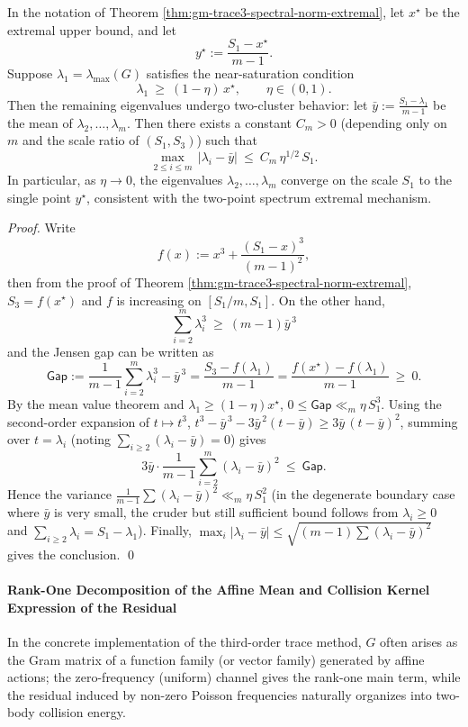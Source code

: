 \begin{proposition}\label{prop:gm-trace3-near-extremal-clustering}
In the notation of Theorem \ref{thm:gm-trace3-spectral-norm-extremal}, let \(x^\star\) be the extremal upper bound, and let
\[
y^\star:=\frac{S_1-x^\star}{m-1}.
\]
Suppose \(\lambda_1=\lambda_{\max}(G)\) satisfies the near-saturation condition
\[
\lambda_1\ \ge\ (1-\eta)\,x^\star,\qquad \eta\in(0,1).
\]
Then the remaining eigenvalues undergo two-cluster behavior: let
\(
\bar y:=\frac{S_1-\lambda_1}{m-1}
\)
be the mean of \(\lambda_2,\dots,\lambda_m\). Then there exists a constant \(C_m>0\) (depending only on \(m\) and the scale ratio of \((S_1,S_3)\)) such that
\[
\max_{2\le i\le m}\,|\lambda_i-\bar y|
\ \le\
C_m\,\eta^{1/2}\,S_1.
\]
In particular, as \(\eta\to 0\), the eigenvalues \(\lambda_2,\dots,\lambda_m\) converge on the scale \(S_1\) to the single point \(y^\star\), consistent with the two-point spectrum extremal mechanism.
\end{proposition}

\begin{proof}
Write
\[
f(x):=x^3+\frac{(S_1-x)^3}{(m-1)^2},
\]
then from the proof of Theorem \ref{thm:gm-trace3-spectral-norm-extremal},
\(
S_3=f(x^\star)
\) and \(f\) is increasing on \([S_1/m,S_1]\).
On the other hand,
\[
\sum_{i=2}^m\lambda_i^3
\ \ge\
(m-1)\bar y^{\,3}
\]
and the Jensen gap can be written as
\[
\mathsf{Gap}
:=\frac{1}{m-1}\sum_{i=2}^m\lambda_i^3-\bar y^{\,3}
=\frac{S_3-f(\lambda_1)}{m-1}
=\frac{f(x^\star)-f(\lambda_1)}{m-1}\ \ge\ 0.
\]
By the mean value theorem and \(\lambda_1\ge(1-\eta)x^\star\),
\(
0\le \mathsf{Gap}\ll_m \eta\,S_1^3
\).
Using the second-order expansion of \(t\mapsto t^3\),
\(
t^3-\bar y^{\,3}-3\bar y^{\,2}(t-\bar y)\ge 3\bar y\,(t-\bar y)^2
\),
summing over \(t=\lambda_i\) (noting \(\sum_{i\ge 2}(\lambda_i-\bar y)=0\)) gives
\[
3\bar y\cdot \frac{1}{m-1}\sum_{i=2}^m(\lambda_i-\bar y)^2
\ \le\ \mathsf{Gap}.
\]
Hence the variance \(\frac{1}{m-1}\sum(\lambda_i-\bar y)^2\ll_m \eta\,S_1^2\) (in the degenerate boundary case where \(\bar y\) is very small, the cruder but still sufficient bound follows from \(\lambda_i\ge 0\) and \(\sum_{i\ge2}\lambda_i=S_1-\lambda_1\)).
Finally, \(\max_i|\lambda_i-\bar y|\le \sqrt{(m-1)\sum(\lambda_i-\bar y)^2}\) gives the conclusion. \qed
\end{proof}

\paragraph{Rank-One Decomposition of the Affine Mean and Collision Kernel Expression of the Residual}
In the concrete implementation of the third-order trace method, \(G\) often arises as the Gram matrix of a function family (or vector family) generated by affine actions; the zero-frequency (uniform) channel gives the rank-one main term, while the residual induced by non-zero Poisson frequencies naturally organizes into two-body collision energy.

